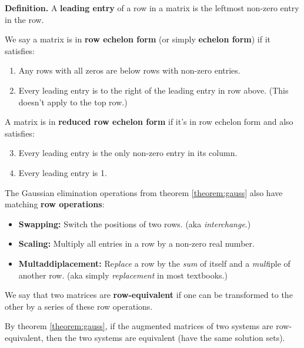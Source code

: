 \documentclass[11pt, letterpaper]{report}
\newenvironment{definition}{\begin{bbox}\par\noindent\textbf{Definition. }}
  {\end{bbox}}
\newcounter{theorem}[chapter]
\newlength\oldfboxsep%
\newlength\myminiwidth%
\newenvironment{bbox}{%
  \setlength\oldfboxsep\fboxsep
  \setlength{\fboxsep}{.1in}%
  \setlength\myminiwidth\linewidth%
  \addtolength\myminiwidth{-0.2in}%
  \vspace{0.1in}%
  \begin{lrbox}{\bboxbox}\begin{minipage}{\myminiwidth}%
    }{%
    \end{minipage}\end{lrbox}%
  \noindent\fbox{\usebox{\bboxbox}}\vspace{0.1in}\setlength\fboxsep\oldfboxsep%
}
\begin{document}
\begin{definition}
A \textbf{leading entry} of a row in a matrix is the leftmost non-zero entry in the row.

We say a matrix is in \textbf{row echelon form}  (or simply \textbf{echelon form}) if it satisfies:
\begin{enumerate}[label=(\roman*)]
\item Any rows with all zeros are below rows with non-zero entries.
\item Every leading entry is to the right of the leading entry in row above. (This doesn't apply to the top row.)
\end{enumerate}
A matrix is in \textbf{reduced row echelon form} if it's in row echelon form and also satisfies:
\begin{enumerate}[label=(\roman*)] \setcounter{enumi}{2}
\item Every leading entry is the only non-zero entry in its column.
\item Every leading entry is 1.
\end{enumerate}

The Gaussian elimination operations from theorem \ref{theorem:gauss} also have matching \textbf{row operations}: 
\begin{itemize}
\item \textbf{Swapping:} Switch the positions of two rows. (aka \emph{interchange}.)
\item \textbf{Scaling:} Multiply all entries in a row by a non-zero real number.
\item \textbf{Multaddiplacement:} Re\emph{place} a row by the \emph{sum} of itself and a \emph{mult}iple of another row. (aka simply \emph{replacement} in most textbooks.)
\end{itemize}
We say that two matrices are \textbf{row-equivalent}  if one can be transformed to the other by a series of these row operations.
\end{definition}
By theorem \ref{theorem:gauss}, if the augmented matrices of two systems are row-equivalent, then the two systems are equivalent (have the same solution sets).
\end{document}

